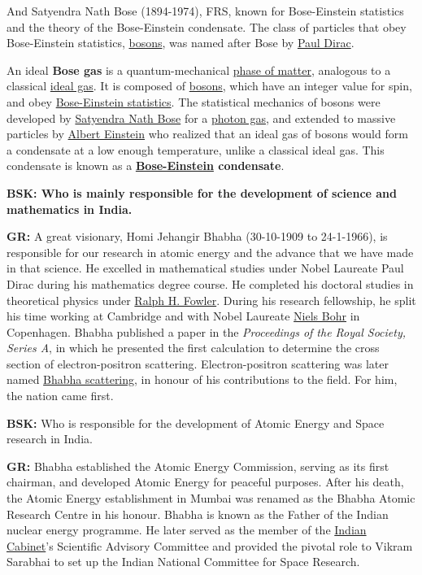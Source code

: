 And Satyendra Nath Bose (1894-1974), FRS, known for Bose-Einstein statistics and the theory of the Bose-Einstein condensate. The class of particles that obey Bose-Einstein statistics, \underline{bosons}, was named after Bose by \underline{Paul Dirac}.

An ideal \textbf{Bose gas} is a quantum-mechanical \underline{phase of matter}, analogous to a classical \underline{ideal gas}. It is composed of \underline{bosons}, which have an integer value for spin, and obey \underline{Bose-Einstein statistics}. The statistical mechanics of bosons were developed by \underline{Satyendra Nath Bose} for a \underline{photon gas}, and extended to massive particles by \underline{Albert Einstein} who realized that an ideal gas of bosons would form a condensate at a low enough temperature, unlike a classical ideal gas. This condensate is known as a \textbf{\underline{Bose-Einstein} condensate}.

\textbf{BSK: Who is mainly responsible for the development of science and mathematics in India.}

\textbf{GR:}  A great visionary, Homi Jehangir Bhabha (30-10-1909 to 24-1-1966), is responsible for our research in atomic energy and the advance that we have made in that science. He excelled in mathematical studies under Nobel Laureate Paul Dirac during his mathematics degree course.  He completed his doctoral studies in theoretical physics under \underline{Ralph H. Fowler}. During his research fellowship, he split his time working at Cambridge and with Nobel Laureate \underline{Niels Bohr} in Copenhagen. Bhabha published a paper in the \textit{Proceedings of the Royal Society, Series A}, in which he presented the first calculation to determine the cross section of electron-positron scattering. Electron-positron scattering was later named \underline{Bhabha scattering}, in honour of his contributions to the field. For him, the nation came first.

\textbf{BSK:} Who is responsible for the development of Atomic Energy and Space research in India.

\textbf{GR:} Bhabha established the Atomic Energy Commission, serving as its first chairman, and developed Atomic Energy for peaceful purposes. After his death, the Atomic Energy establishment in Mumbai was renamed as the Bhabha Atomic Research Centre in his honour. Bhabha is known as the Father of the Indian nuclear energy programme. He later served as the member of the \underline{Indian Cabinet}'s Scientific Advisory Committee and provided the pivotal role to Vikram Sarabhai to set up the Indian National Committee for Space Research.

